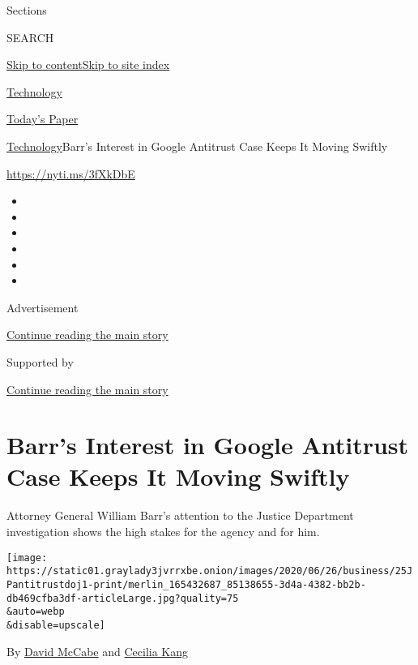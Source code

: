 Sections

SEARCH

\protect\hyperlink{site-content}{Skip to
content}\protect\hyperlink{site-index}{Skip to site index}

\href{https://www.nytimes3xbfgragh.onion/section/technology}{Technology}

\href{https://myaccount.nytimes3xbfgragh.onion/auth/login?response_type=cookie\&client_id=vi}{}

\href{https://www.nytimes3xbfgragh.onion/section/todayspaper}{Today's
Paper}

\href{/section/technology}{Technology}\textbar{}Barr's Interest in
Google Antitrust Case Keeps It Moving Swiftly

\href{https://nyti.ms/3fXkDbE}{https://nyti.ms/3fXkDbE}

\begin{itemize}
\item
\item
\item
\item
\item
\item
\end{itemize}

Advertisement

\protect\hyperlink{after-top}{Continue reading the main story}

Supported by

\protect\hyperlink{after-sponsor}{Continue reading the main story}

\hypertarget{barrs-interest-in-google-antitrust-case-keeps-it-moving-swiftly}{%
\section{Barr's Interest in Google Antitrust Case Keeps It Moving
Swiftly}\label{barrs-interest-in-google-antitrust-case-keeps-it-moving-swiftly}}

Attorney General William Barr's attention to the Justice Department
investigation shows the high stakes for the agency and for him.

\texttt{[image: https://static01.graylady3jvrrxbe.onion/images/2020/06/26/business/25JPantitrustdoj1-print/merlin\_165432687\_85138655-3d4a-4382-bb2b-db469cfba3df-articleLarge.jpg?quality=75\\\&auto=webp\\\&disable=upscale]}

By \href{https://www.nytimes3xbfgragh.onion/by/david-mccabe}{David
McCabe} and
\href{https://www.nytimes3xbfgragh.onion/by/cecilia-kang}{Cecilia Kang}

